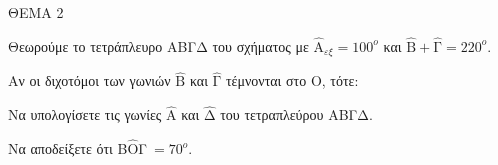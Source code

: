 
ΘΕΜΑ 2

Θεωρούμε το τετράπλευρο ΑΒΓΔ του σχήματος με ${\widehat{\text{Α}}}_{\varepsilon\xi} = 100^{ο}$ και $\widehat{\text{Β}} + \widehat{\text{Γ}} = 220^{ο}$.

Αν οι διχοτόμοι των γωνιών $\widehat{\text{Β}}$ και $\widehat{\text{Γ}}$ τέμνονται στο Ο, τότε:

\begin{alist}
\item Να υπολογίσετε τις γωνίες $\widehat{\text{Α}}$ και $\widehat{\text{Δ}}$ του τετραπλεύρου ΑΒΓΔ.


\item Να αποδείξετε ότι Β$\widehat{\text{Ο}}$Γ$\  = 70^{ο}$.



\end{alist}
